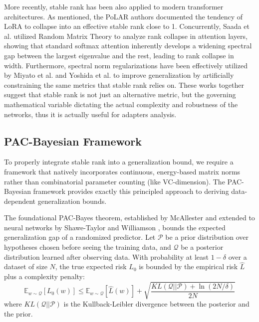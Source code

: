 \documentclass[a4paper,14pt]{extarticle}
\begin{document}
    More recently, stable rank has been also applied to modern transformer architectures. As mentioned, the PoLAR authors \cite{lion2025polar} documented the tendency of LoRA to collapse into an effective stable rank close to 1. Concurrently, Saada et al. \cite{saada2025mindgapspectralanalysis} utilized Random Matrix Theory to analyze rank collapse in attention layers, showing that standard softmax attention inherently develops a widening spectral gap between the largest eigenvalue and the rest, leading to rank collapse in width. Furthermore, spectral norm regularizations have been effectively utilized by Miyato et al. \cite{miyato2018spectral} and Yoshida et al. \cite{yoshida2017spectral} to improve generalization by artificially constraining the same metrics that stable rank relies on. These works together suggest that stable rank is not just an alternative metric, but the governing mathematical variable dictating the actual complexity and robustness of the networks, thus it is actually useful for adapters analysis.



    \subsection{PAC-Bayesian Framework}
    
    To properly integrate stable rank into a generalization bound, we require a framework that natively incorporates continuous, energy-based matrix norms rather than combinatorial parameter counting (like VC-dimension). The PAC-Bayesian framework provides exactly this principled approach to deriving data-dependent generalization bounds.

    The foundational PAC-Bayes theorem, established by McAllester \cite{mcallester1999pac, mcallester2003simplified} and extended to neural networks by Shawe-Taylor and Williamson \cite{shawe1997pac}, bounds the expected generalization gap of a randomized predictor. Let $\mathcal{P}$ be a prior distribution over hypotheses chosen before seeing the training data, and $\mathcal{Q}$ be a posterior distribution learned after observing data. With probability at least $1-\delta$ over a dataset of size $N$, the true expected risk $L_0$ is bounded by the empirical risk $\widehat{L}$ plus a complexity penalty:
    \begin{equation}
        \mathbb{E}_{w \sim \mathcal{Q}}[L_{0}(w)] \leqslant \mathbb{E}_{w \sim \mathcal{Q}}[\widehat{L}(w)] + \sqrt{\frac{KL(\mathcal{Q} || \mathcal{P}) + \ln(2N/\delta)}{2N}}
    \end{equation}
    where $KL(\mathcal{Q} || \mathcal{P})$ is the Kullback-Leibler divergence between the posterior and the prior. 
\end{document}
